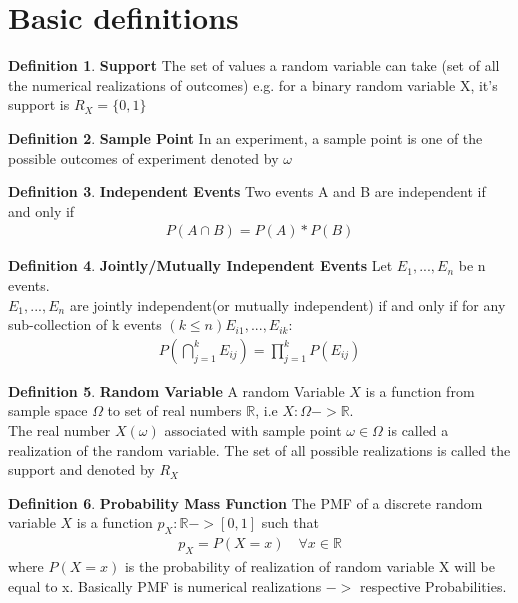 \documentclass[10pt,a4paper]{article}
\newcommand{\R}{\mathbb{R}}
\begin{document}
\theoremstyle{definition}
\newtheorem{defn}{Definition}[section]


	\section{Basic definitions}

	\begin{defn}{\textbf{Support}}
		The set of values a random variable can take (set of all the numerical realizations of outcomes) e.g. for a binary random variable X, it's support is $R_X = \{ 0, 1 \}$
	\end{defn}


	\begin{defn}{\textbf{Sample Point}}
		In an experiment, a sample point is one of the possible outcomes of experiment denoted by $\omega$
	\end{defn}

	\begin{defn}{\textbf{Independent Events}}
	Two events A and B are independent if and only if \\
	\begin{align}
		P(A \cap B) = P(A) * P(B)
	\end{align}
	\end{defn}

	\begin{defn}{\textbf{Jointly/Mutually Independent Events}}
	Let $E_1, ... , E_n$ be n events. \\
	$E_1, ... , E_n$ are jointly independent(or mutually independent)
	if and only if for any sub-collection of k events $(k \leq n) E_{i1}, ... , E_{ik}$:
	\begin{align}
	P(\bigcap \limits_{j=1}^kE_{ij}) = \prod_{j=1}^{k}P(E_{ij})
	\end{align}
	\end{defn}

	\begin{defn}{\textbf{Random Variable}}
		A random Variable $X$ is a function from sample space $\Omega$ to set of real numbers $\R$, i.e $ X: \Omega -> \R $.\\
		
		The real number $X(\omega)$ associated with sample point $\omega \in \Omega$ is called a realization of the random variable. The set of all possible realizations is called the support and denoted by $R_X$
	\end{defn}

	\begin{defn}{\textbf{Probability Mass Function}}
		The PMF of a discrete random variable $X$ is a function $p_X : \R -> [0,1]$ such that\\
		\begin{align}
			p_X = P(X = x)\quad \forall x \in \R
		\end{align}
		where $P(X = x)$ is the probability of realization of random variable X will be equal to x. Basically PMF is numerical realizations $->$ respective Probabilities.
	\end{defn}
\end{document}
